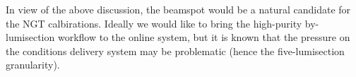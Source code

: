 In view of the above discussion, the beamspot would be a natural candidate for the NGT calbirations.
Ideally we would like to bring the high-purity by-lumisection workflow to the online system,
but it is known that the pressure on the conditions delivery system may be problematic (hence the five-lumisection granularity).






